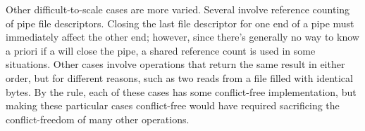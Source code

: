 
Other difficult-to-scale cases are more varied.  Several involve
reference counting of pipe file descriptors.  Closing the last file
descriptor for one end of a pipe must immediately affect the other
end; however, since there's generally no way to know a priori if a
 will close the pipe, a shared reference count is used in
some situations.  Other cases involve operations that return the same
result in either order, but for different reasons, such as two reads
from a file filled with identical bytes.
%
By the rule, each of these cases has some conflict-free
implementation, but making these particular cases conflict-free would
have required sacrificing the conflict-freedom of many other
operations.



